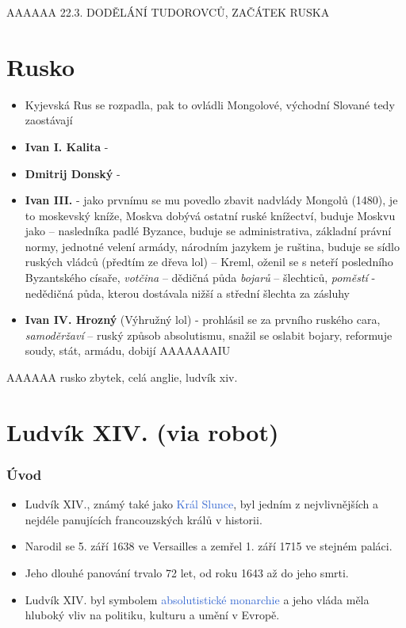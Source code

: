 \documentclass{article}
\begin{document}
AAAAAA 22.3. DODĚLÁNÍ TUDOROVCŮ, ZAČÁTEK RUSKA

\part{Rusko}
\begin{itemize}
  \item Kyjevská Rus se rozpadla, pak to ovládli Mongolové, východní Slované tedy zaostávají
  \item \textbf{Ivan I. Kalita} -
  \item \textbf{Dmitrij Donský} -
  \item \textbf{Ivan III.} - jako prvnímu se mu povedlo zbavit nadvlády Mongolů (1480), je to moskevský kníže, Moskva dobývá ostatní ruské knížectví, buduje Moskvu jako  -- nasledníka padlé Byzance, buduje se administrativa, základní právní normy, jednotné velení armády, národním jazykem je ruština, buduje se sídlo ruských vládců (předtím ze dřeva lol) -- Kreml, oženil se s neteří posledního Byzantského císaře, \textit{votčina} -- dědičná půda \textit{bojarů} -- šlechticů, \textit{poměstí} - nedědičná půda, kterou dostávala nižší a střední šlechta za zásluhy
  \item \textbf{Ivan IV. Hrozný} (Výhružný lol) - prohlásil se za prvního ruského cara, \textit{samoděržaví} -- ruský způsob absolutismu, snažil se oslabit bojary, reformuje soudy, stát, armádu, dobijí AAAAAAAIU
\end{itemize}

AAAAAA rusko zbytek, celá anglie, ludvík xiv.

\part{Ludvík XIV. (via robot)}

\section{Úvod}
\begin{itemize}[label=$\bullet$,itemsep=2pt]
  \item Ludvík XIV., známý také jako \textcolor{highlight}{Král Slunce}, byl jedním z nejvlivnějších a nejdéle panujících francouzských králů v historii.
  \item Narodil se 5. září 1638 ve Versailles a zemřel 1. září 1715 ve stejném paláci.
  \item Jeho dlouhé panování trvalo 72 let, od roku 1643 až do jeho smrti.
  \item Ludvík XIV. byl symbolem \textcolor{highlight}{absolutistické monarchie} a jeho vláda měla hluboký vliv na politiku, kulturu a umění v Evropě.
\end{itemize}
\end{document}
